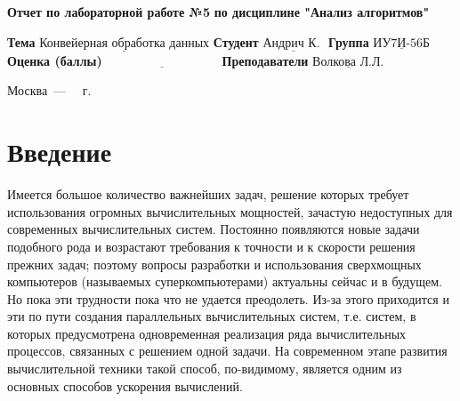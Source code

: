 \documentclass[12pt]{report}
\begin{document}
\begin{titlepage}
	
	\begin{center}
		\noindent\begin{minipage}{1.3\textwidth}\centering
			\Large\textbf{  Отчет по лабораторной работе №5}\newline
			\textbf{по дисциплине "Анализ алгоритмов"}\newline\newline
		\end{minipage}
	\end{center}
	
	\noindent\textbf{Тема} $\underline{\text{Конвейерная обработка данных}}$\newline\newline
	\noindent\textbf{Студент} $\underline{\text{Андрич К. }}$\newline\newline
	\noindent\textbf{Группа} $\underline{\text{ИУ7И-56Б}}$\newline\newline
	\noindent\textbf{Оценка (баллы)} $\underline{\text{~~~~~~~~~~~~~~~~~~~~~~~~~~~}}$\newline\newline
	\noindent\textbf{Преподаватели} $\underline{\text{Волкова Л.Л.}}$\newline\newline\newline
	
	\begin{center}
		\vfill
		Москва~---~\the\year
		~г.
	\end{center}
\end{titlepage}


\tableofcontents

\newpage
\chapter*{Введение}
Имеется большое количество важнейших задач, решение которых
требует использования огромных вычислительных мощностей, зачастую
недоступных для современных вычислительных систем.
Постоянно появляются новые задачи подобного рода и возрастают
требования к точности и к скорости решения прежних задач; поэтому вопросы разработки и использования сверхмощных компьютеров (называемых суперкомпьютерами) актуальны сейчас и в будущем. Но пока эти
трудности пока что не удается преодолеть. Из-за этого приходится и эти по
пути создания параллельных вычислительных систем, т.е. систем, в которых предусмотрена одновременная реализация ряда вычислительных процессов, связанных с решением одной задачи. На современном этапе развития вычислительной техники такой способ, по-видимому, является одним
из основных способов ускорения вычислений.
\newline
\end{document}
